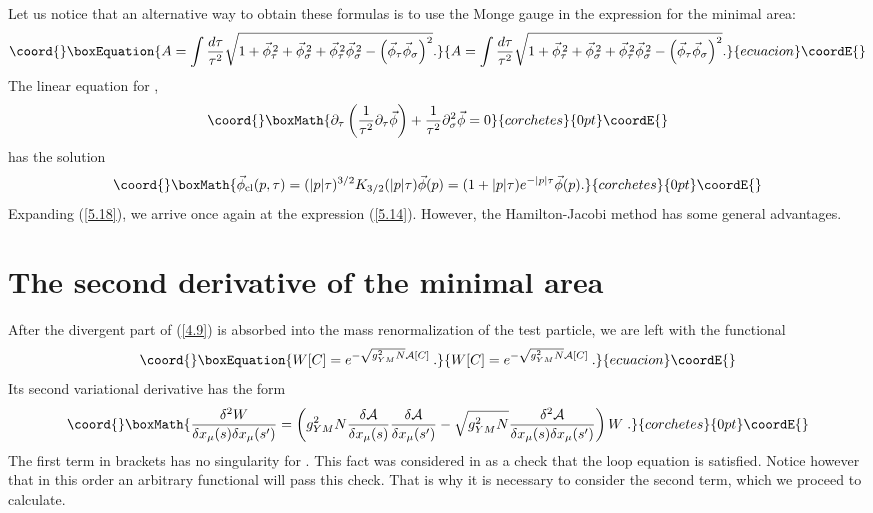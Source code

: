 \documentclass[a4paper,12pt]{article}
\numberwithin{equation}{section}
\begin{document}
Let us notice that an alternative way to obtain these formulas is to use the
Monge gauge in the expression for the minimal area: \coordHE{}
\begin{equation}\coord{}\boxEquation{
\label{5.18}
A=\int \frac{d\tau }{\tau ^{2}}\sqrt{{1+\vec{\phi }_{\tau }^{\, 2}+\vec{\phi }_{\sigma }^{\, 2}+\vec{\phi }_{\tau }^{\, 2}\vec{\phi }_{\sigma }^{\, 2}-\left( \vec{\phi }_{\tau }\vec{\phi }_{\sigma }\right) ^{2}}}.
}{
A=\int \frac{d\tau }{\tau ^{2}}\sqrt{{1+\vec{\phi }_{\tau }^{\, 2}+\vec{\phi }_{\sigma }^{\, 2}+\vec{\phi }_{\tau }^{\, 2}\vec{\phi }_{\sigma }^{\, 2}-\left( \vec{\phi }_{\tau }\vec{\phi }_{\sigma }\right) ^{2}}}.
}{ecuacion}\coordE{}\end{equation}
 The linear equation for \myHighlight{\( \vec{\phi } \)}\coordHE{},
\[\coord{}\boxMath{
\partial _{\tau }\left( \frac{1}{\tau ^{2}}\partial _{\tau }\vec{\phi }\right) +\frac{1}{\tau ^{2}}\partial _{\sigma }^{2}\vec{\phi }=0}{corchetes}{0pt}\coordE{}\]
 has the solution
\[\coord{}\boxMath{
\vec{\phi }_{\textrm{cl}}(p,\tau )=(|p|\tau )^{3/2}K_{3/2}(|p|\tau )\vec{\phi }(p)=(1+|p|\tau )e^{-|p|\tau }\vec{\phi }(p).}{corchetes}{0pt}\coordE{}\]
Expanding (\ref{5.18}), we arrive once again at the expression (\ref{5.14}).
However, the Hamilton-Jacobi method has some general advantages.


\section{The second derivative of the minimal area}

After the divergent part of (\ref{4.9}) is absorbed into the mass renormalization
of the test particle, we are left with the functional 
\begin{equation}\coord{}\boxEquation{
\label{7.05}
W[C]=e^{-\sqrt{{g^{2}_{YM}N}}\mathcal{A}[C]}\: .
}{
W[C]=e^{-\sqrt{{g^{2}_{YM}N}}\mathcal{A}[C]}\: .
}{ecuacion}\coordE{}\end{equation}
 Its second variational derivative has the form
\[\coord{}\boxMath{
\frac{\delta ^{2}W}{\delta x_{\mu }(s)\delta x_{\mu }(s')}=\left( g^{2}_{YM}N\frac{\delta \mathcal{A}}{\delta x_{\mu }(s)}\frac{\delta \mathcal{A}}{\delta x_{\mu }(s')}-\sqrt{{g^{2}_{YM}N}}\frac{\delta ^{2}\mathcal{A}}{\delta x_{\mu }(s)\delta x_{\mu }(s')}\right) W\; .}{corchetes}{0pt}\coordE{}\]
 The first term in brackets has no singularity for \coordHE{}. This fact
was considered in \cite{15} as a check that the loop equation is satisfied.
Notice however that in this order an arbitrary functional \coordHE{}
will pass this check. That is why it is necessary to consider the second term,
which we proceed to calculate. 
\end{document}
